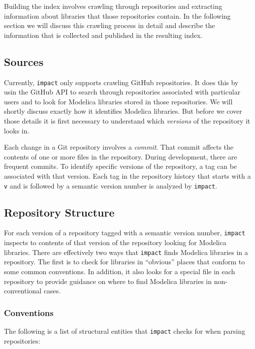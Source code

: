 \documentclass[11pt,a4paper,twocolumn]{article}
\newcommand{\code}[1]{\texttt{#1}} %
\begin{document}
Building the index involves crawling through repositories and
extracting information about libraries that those repositories
contain.  In the following section we will discuss this crawling
process in detail and describe the information that is collected and
published in the resulting index.

\subsection{Sources}

Currently, \code{impact} only supports crawling GitHub\cite{github}
repositories.  It does this by usin the GitHub API\cite{gh-api} to
search through repositories associated with particular users and to
look for Modelica libraries stored in those repositories.  We will
shortly discuss exactly how it identifies Modelica libraries.  But
before we cover those details it is first necessary to understand
which {\em versions} of the repository it looks in.

Each change in a Git repository involves a {\em commit}.  That commit
affects the contents of one or more files in the repository.  During
development, there are frequent commits.  To identify specific
versions of the repository, a tag can be associated with that
version.  Each tag in the repository history that starts with a
\code{v} and is followed by a semantic version number is analyzed by
\code{impact}.

\subsection{Repository Structure}

For each version of a repository tagged with a semantic version
number, \code{impact} inspects to contents of that version of the
repository looking for Modelica libraries.  There are effectively two
ways that \code{impact} finds Modelica libraries in a repository.  The
first is to check for libraries in ``obvious'' places that conform to
some common conventions.  In addition, it also looks for a special
file in each repository to provide guidance on where to find Modelica
libraries in non-conventional cases.

\subsubsection{Conventions}

The following is a list of structural entities that \code{impact}
checks for when parsing repositories:
\end{document}
